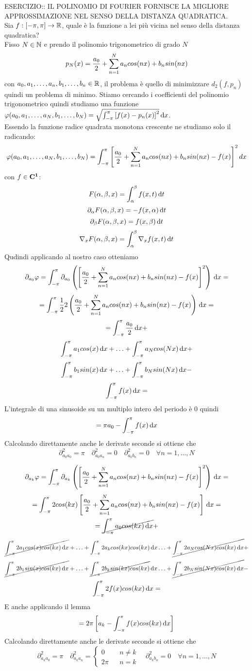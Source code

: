ESERCIZIO:: IL POLINOMIO DI FOURIER FORNISCE LA MIGLIORE APPROSSIMAZIONE NEL SENSO DELLA DISTANZA QUADRATICA.\\
Sia $f: \left[-\pi,\pi\right] \to \mathbb{R}$, quale è la funzione a lei più vicina nel senso della distanza quadratica?\\
Fisso $N\in\mathbb{N}$ e prendo il polinomio trigonometrico di grado $N$
\[p_N(x)=\frac{a_0}{2}+\sum\limits_{n=1}^{N}a_{n}cos(nx)+b_{n}sin(nx)\]
con $a_0,a_1,\dotsc,a_n,b_1,\dotsc,b_n\in \mathbb{R}$, il problema è quello di minimizzare $d_2(f,p_n)$ quindi un problema di minimo. Stiamo cercando i coefficienti del polinomio trigonometrico quindi studiamo una funzione $\varphi(a_0,a_1,\dotsc,a_N,b_1,\dotsc,b_N) = \sqrt{\int_{-\pi}^{\pi}\left[f(x)-p_n(x)\right]^2}\,\mathrm{d}{x}$.\\
Essendo la funzione radice quadrata monotona crescente ne studiamo solo il radicando:
\[\varphi(a_0,a_1,\dotsc,a_N,b_1,\dotsc,b_N)=\int_{-\pi}^{\pi}\left[\frac{a_0}{2}+\sum\limits_{n=1}^{N}a_{n}cos(nx)+b_{n}sin(nx)-f(x)\right]^2dx\]
\observation
con $f\in \mathbf{C^{1}}$:
\[F(\alpha,\beta,x)=\int_{\alpha}^{\beta}f(x,t)\,\mathrm{d}{t}\]
\[\partial_\alpha F(\alpha,\beta,x)=-f(x,\alpha)\,\mathrm{d}{t}\]
\[\partial_\beta F(\alpha,\beta,x)=f(x,\beta)\,\mathrm{d}{t}\]
\[\nabla_x F(\alpha,\beta,x)=\int_{\alpha}^{\beta}\nabla_xf(x,t)\,\mathrm{d}{t}\]
Qudindi applicando al nostro caso otteniamo
\[\partial_{a_0}\varphi = \int_{-\pi}^{\pi}\partial_{a_0}\left(\left[\frac{a_0}{2}+\sum\limits_{n=1}^{N}a_{n}cos(nx)+b_{n}sin(nx)-f(x)\right]^2\right)\,\mathrm{d}{x}=\]
\[ = \int_{-\pi}^{\pi} \frac{1}{2}2\left(\frac{a_0}{2}+\sum\limits_{n=1}^{N}a_{n}cos(nx)+b_{n}sin(nx)-f(x)\right)\,\mathrm{d}{x}=\]
\[ =  \int_{-\pi}^{\pi} \frac{a_0}{2}\,\mathrm{d}{x} + \]
\[\int_{-\pi}^{\pi} a_1cos(x)\,\mathrm{d}{x} +
\ldots +
\int_{-\pi}^{\pi} a_Ncos(Nx)\,\mathrm{d}{x} + \]
\[\int_{-\pi}^{\pi} b_1sin(x)\,\mathrm{d}{x} +
\ldots +
\int_{-\pi}^{\pi} b_Nsin(Nx)\,\mathrm{d}{x} - \]
\[ \int_{-\pi}^{\pi} f(x)\,\mathrm{d}{x} = \]
L'integrale di una sinusoide su un multiplo intero del periodo è $0$ quindi
\[=\pi a_0-\int_{-\pi}^{\pi}f(x)\,\mathrm{d}{x}\]
Calcolando direttamente anche le derivate seconde si ottiene che
\[\partial^2_{a_0a_0}=\pi\quad\partial^2_{a_0a_n}=0\quad\partial^2_{a_0b_n}=0\quad\forall n=1,\dotsc,N\]

\[\partial_{a_k}\varphi = \int_{-\pi}^{\pi}\partial_{a_k}\left(\left[\frac{a_0}{2}+\sum\limits_{n=1}^{N}a_{n}cos(nx)+b_{n}sin(nx)-f(x)\right]^2\right)\,\mathrm{d}{x}=\]
\[ = \int_{-\pi}^{\pi} 2cos(kx) \left[\frac{a_0}{2}+\sum\limits_{n=1}^{N}a_{n}cos(nx)+b_{n}sin(nx)-f(x)\right]\,\mathrm{d}{x}=\]
\[ =  \cancel{\int_{-\pi}^{\pi} a_0cos(kx)\,\mathrm{d}{x}} + \]
\[\cancel{\int_{-\pi}^{\pi} 2a_1cos(x)cos(kx)\,\mathrm{d}{x}} +
\ldots +
\int_{-\pi}^{\pi} 2a_kcos(kx)cos(kx)\,\mathrm{d}{x}
\ldots +
\cancel{\int_{-\pi}^{\pi} 2a_Ncos(Nx)cos(kx)\,\mathrm{d}{x}} + \]
\[\cancel{\int_{-\pi}^{\pi} 2b_1sin(x)cos(kx)\,\mathrm{d}{x}} +
\ldots +
\cancel{\int_{-\pi}^{\pi} 2b_ksin(kx)cos(kx)}\,\mathrm{d}{x}
\ldots +
\cancel{\int_{-\pi}^{\pi} 2b_Nsin(Nx)cos(kx)\,\mathrm{d}{x}} - \]
\[\int_{-\pi}^{\pi} 2f(x)cos(kx)\,\mathrm{d}{x} = \]
E anche applicando il lemma
\[=2\pi\left[a_k-\int_{-\pi}^{\pi}f(x)cos(kx)\,\mathrm{d}{x}\right]\]
Calcolando direttamente anche le derivate seconde si ottiene che
\[\partial^2_{a_ka_0}=\pi\quad\partial^2_{a_ka_n}=
\left\{\begin{matrix}
0&&n\ne k\\2\pi&&n=k
\end{matrix}\right.
\quad\partial^2_{a_kb_n}=0\quad\forall n=1,\dotsc,N\]

